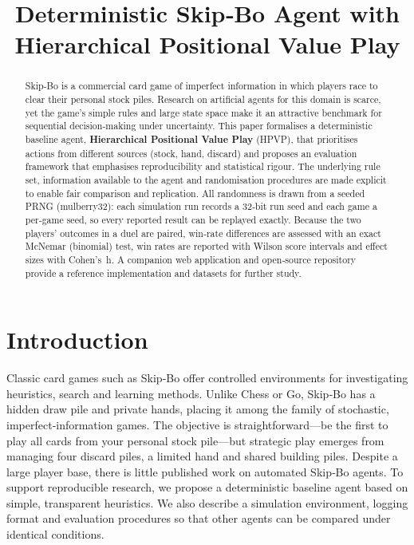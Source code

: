 \documentclass[11pt]{article}
\title{Deterministic Skip‑Bo Agent with Hierarchical Positional Value Play}
\author{}
\date{}
\begin{document}
\maketitle

\begin{abstract}
Skip‑Bo is a commercial card game of imperfect information in which players race to clear their personal stock piles. Research on artificial agents for this domain is scarce, yet the game’s simple rules and large state space make it an attractive benchmark for sequential decision‑making under uncertainty. This paper formalises a deterministic baseline agent, \textbf{Hierarchical Positional Value Play} (HPVP), that prioritises actions from different sources (stock, hand, discard) and proposes an evaluation framework that emphasises reproducibility and statistical rigour. The underlying rule set, information available to the agent and randomisation procedures are made explicit to enable fair comparison and replication. All randomness is drawn from a seeded PRNG (mulberry32): each simulation run records a 32‑bit run seed and each game a per‑game seed, so every reported result can be replayed exactly. Because the two players' outcomes in a duel are paired, win‑rate differences are assessed with an exact McNemar (binomial) test, win rates are reported with Wilson score intervals and effect sizes with Cohen's h. A companion web application and open‑source repository provide a reference implementation and datasets for further study.
\end{abstract}

\section{Introduction}
Classic card games such as Skip‑Bo offer controlled environments for investigating heuristics, search and learning methods. Unlike Chess or Go, Skip‑Bo has a hidden draw pile and private hands, placing it among the family of stochastic, imperfect‑information games. The objective is straightforward---be the first to play all cards from your personal stock pile---but strategic play emerges from managing four discard piles, a limited hand and shared building piles. Despite a large player base, there is little published work on automated Skip‑Bo agents. To support reproducible research, we propose a deterministic baseline agent based on simple, transparent heuristics. We also describe a simulation environment, logging format and evaluation procedures so that other agents can be compared under identical conditions.
\end{document}

